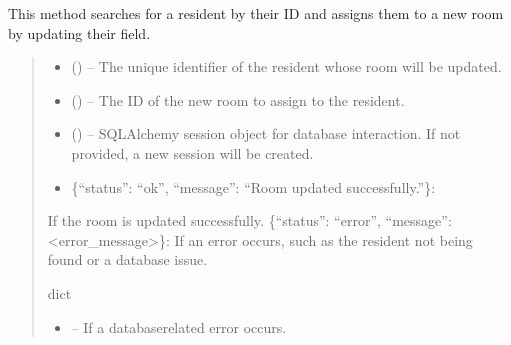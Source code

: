 \documentclass[letterpaper,10pt,english]{sphinxmanual}
\begin{document}
\begin{fulllineitems}
\begin{fulllineitems}
\sphinxAtStartPar
This method searches for a resident by their ID and assigns them to a new room
by updating their  field.
\begin{quote}\begin{description}
\begin{itemize}
\item {} 
\sphinxAtStartPar
{} () – The unique identifier of the resident whose room will be updated.

\item {} 
\sphinxAtStartPar
{} () – The ID of the new room to assign to the resident.

\item {} 
\sphinxAtStartPar
{} (\sphinxstyleliteralemphasis{\sphinxupquote{, }}) – SQLAlchemy session object for database interaction.
If not provided, a new session will be created.

\end{itemize}

\sphinxAtStartPar
\begin{description}
\begin{itemize}
\item {} 
\sphinxAtStartPar
\{“status”: “ok”, “message”: “Room updated successfully.”\}:

\end{itemize}

\sphinxAtStartPar
If the room is updated successfully.
\sphinxhyphen{} \{“status”: “error”, “message”: <error\_message>\}:
If an error occurs, such as the resident not being found or a database issue.

\end{description}


\sphinxAtStartPar
dict

\begin{itemize}
\item {} 
\sphinxAtStartPar
{} – If a database\sphinxhyphen{}related error occurs.


\end{itemize}
\end{description}
\end{quote}
\end{fulllineitems}
\end{fulllineitems}
\end{document}
